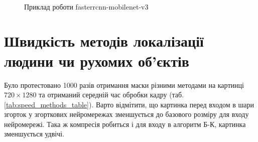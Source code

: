 \begin{figure}[H]
    \centering
    \\
    \caption{Приклад роботи fasterrcnn-mobilenet-v3
        \label{fig:fasterrcnn_examples}
    }
\end{figure}

\section{Швидкість методів локалізації людини чи рухомих об'єктів}

Було протестовано 1000 разів отримання маски різними методами на картинці $720 \times 1280$ та
отриманий середній час обробки кадру (таб. \ref{tab:speed_methods_table}).
Варто відмітити, що картинка перед входом в шари згорток у згорткових нейромережах зменшується
до базового розміру для входу нейромережі. Така ж компресія робиться і для входу
в алгоритм Б-К, картинка зменшується удвічі.

